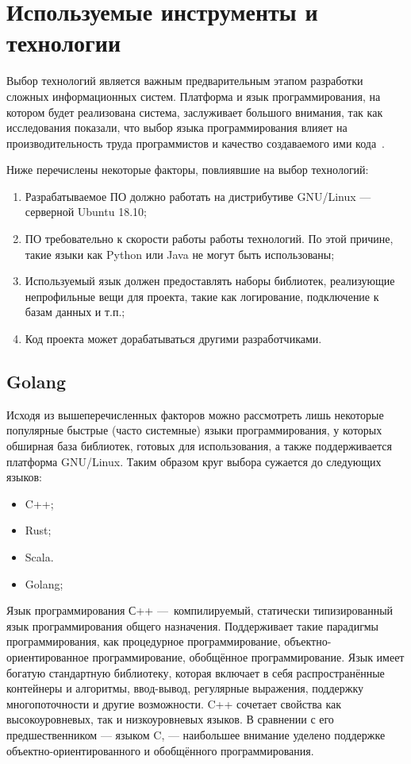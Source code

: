 \section{Используемые инструменты и технологии}\label{sec:tools}

Выбор технологий является важным предварительным этапом разработки сложных информационных систем. Платформа и язык программирования, на котором будет реализована система, заслуживает большого внимания, так как исследования показали, что выбор языка программирования влияет на производительность труда программистов и качество создаваемого ими кода~\cite{code_complete}. %

Ниже перечислены некоторые факторы, повлиявшие на выбор технологий:
\begin{enumerate}
    \item Разрабатываемое ПО должно работать на дистрибутиве GNU/Linux — серверной Ubuntu 18.10;
    \item ПО требовательно к скорости работы работы технологий. По этой причине, такие языки как Python или Java не могут быть использованы;
    \item Используемый язык должен предоставлять наборы библиотек, реализующие непрофильные вещи для проекта, такие как логирование, подключение к базам данных и т.п.;
    \item Код проекта может дорабатываться другими разработчиками.
\end{enumerate}

\subsection{Golang}

Исходя из вышеперечисленных факторов можно рассмотреть лишь некоторые популярные быстрые (часто системные) языки программирования, у которых обширная база библиотек, готовых для использования, а также поддерживается платформа GNU/Linux. Таким образом круг выбора сужается до следующих языков:
\begin{itemize}
    \item C++;
    \item Rust;
    \item Scala.
    \item Golang;
\end{itemize}

Язык программирования С++ — компилируемый, статически типизированный язык программирования общего назначения. Поддерживает такие парадигмы программирования, как процедурное программирование, объектно-ориентированное программирование, обобщённое программирование. Язык имеет богатую стандартную библиотеку, которая включает в себя распространённые контейнеры и алгоритмы, ввод-вывод, регулярные выражения, поддержку многопоточности и другие возможности. C++ сочетает свойства как высокоуровневых, так и низкоуровневых языков. В сравнении с его предшественником — языком C, — наибольшее внимание уделено поддержке объектно-ориентированного и обобщённого программирования.

